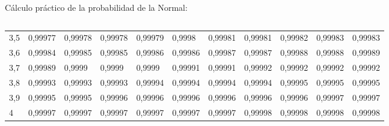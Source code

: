 \documentclass[11pt,handout]{beamer}
\begin{document}
\begin{frame}{Cálculo práctico de la probabilidad de la Normal:}
\begin{columns}
\begin{column}{0.4\textwidth}
{\begin{tabular}{l|llllllllll}
3,5 & 0,99977 & 0,99978 & 0,99978 & 0,99979 & 0,9998  & 0,99981 & 0,99981 & 0,99982 & 0,99983 & 0,99983 \\
3,6 & 0,99984 & 0,99985 & 0,99985 & 0,99986 & 0,99986 & 0,99987 & 0,99987 & 0,99988 & 0,99988 & 0,99989 \\
3,7 & 0,99989 & 0,9999  & 0,9999  & 0,9999  & 0,99991 & 0,99991 & 0,99992 & 0,99992 & 0,99992 & 0,99992 \\
3,8 & 0,99993 & 0,99993 & 0,99993 & 0,99994 & 0,99994 & 0,99994 & 0,99994 & 0,99995 & 0,99995 & 0,99995 \\
3,9 & 0,99995 & 0,99995 & 0,99996 & 0,99996 & 0,99996 & 0,99996 & 0,99996 & 0,99996 & 0,99997 & 0,99997 \\
4   & 0,99997 & 0,99997 & 0,99997 & 0,99997 & 0,99997 & 0,99997 & 0,99998 & 0,99998 & 0,99998 & 0,99998
\end{tabular}

}
\end{column}
\end{columns}
\end{frame}
\end{document}
